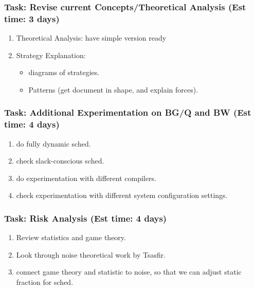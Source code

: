 \begin{frame} [Tasks] 
\frametitle{Task: Revise current Concepts/Theoretical Analysis (Est time: 3 days) }
\begin{enumerate} 
\item Theoretical Analysis: have simple version ready \\
\item Strategy Explanation: \\
\begin{itemize}
   \item diagrams of strategies. 
   \item  Patterns (get document in shape, and explain forces). 
\end{itemize} 
\end{enumerate}
\end{frame}  

\begin{frame} [Tasks] 
\frametitle{Task: Additional Experimentation on BG/Q and BW (Est time: 4 days)}
\begin{enumerate} 
\item do fully dynamic sched. 
\item check slack-conscious sched. 
\item do experimentation with different compilers. 
\item check experimentation with different system configuration settings. 
\end{enumerate} 
\end{frame}  

\begin{frame} [Tasks] 
\frametitle{Task: Risk Analysis (Est time:  4 days) }
\begin{enumerate} 
\item Review statistics and game theory. 
\item Look through noise theoretical work by Tsasfir.
\item connect game theory and statistic to noise, so that we 
can adjust static fraction for sched. 
\end{enumerate} 
\end{frame} 


